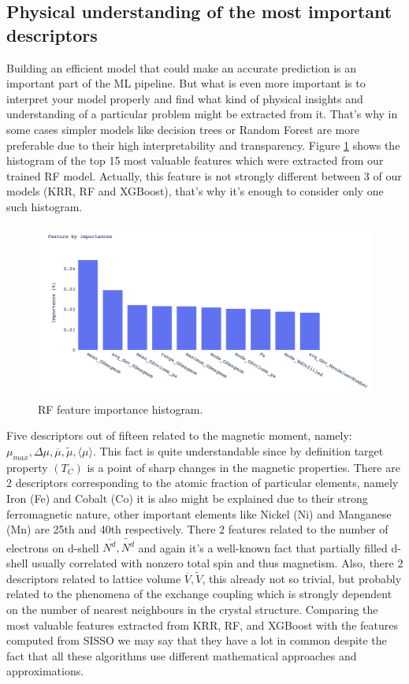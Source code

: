 \subsection{Physical understanding of the most important descriptors}

Building an efficient model that could make an accurate prediction is an important part of the ML pipeline. But what is even more important is to interpret your model properly and find what kind of physical insights and understanding of a particular problem might be extracted from it. That's why in some cases simpler models like decision trees or Random Forest are more preferable due to their high interpretability and transparency.
Figure \ref{fig:rf_features} shows the histogram of the top 15 most valuable features which were extracted from our trained RF model. Actually, this feature is not strongly different between 3 of our models (KRR, RF and XGBoost), that's why it's enough to consider only one such histogram.

\begin{figure}[H]
	\centering
	\includegraphics[width=160mm]{fig/ml_fig/rf_features.png}
	\caption[RF feature importance histogram.]{RF feature importance histogram.}
\label{fig:rf_features}
\end{figure}

Five descriptors out of fifteen related to the magnetic moment, namely: $\mu_{max}, \Delta \mu,  \overline{\mu}, \tilde{\mu}, \langle \mu \rangle$. This fact is quite understandable since by definition target property $(T_C)$ is a point of sharp changes in the magnetic properties.
There are 2 descriptors corresponding to the atomic fraction of particular elements, namely Iron (Fe) and Cobalt (Co) it is also might be explained due to their strong ferromagnetic nature, other important elements like Nickel (Ni) and Manganese (Mn) are 25th and 40th respectively.
There 2 features related to the number of electrons on d-shell $\overline{N^d}, \widetilde{N^d}$ and again it’s a well-known fact that partially filled d-shell usually correlated with nonzero total spin and thus magnetism.
Also, there 2 descriptors related to lattice volume $\overline{V}, \widetilde{V}$, this already not so trivial, but probably related to the phenomena of the exchange coupling which is strongly dependent on the number of nearest neighbours in the crystal structure.
Comparing the most valuable features extracted from KRR, RF, and XGBoost with the features computed from SISSO we may say that they have a lot in common despite the fact that all these algorithms use different mathematical approaches and approximations.

